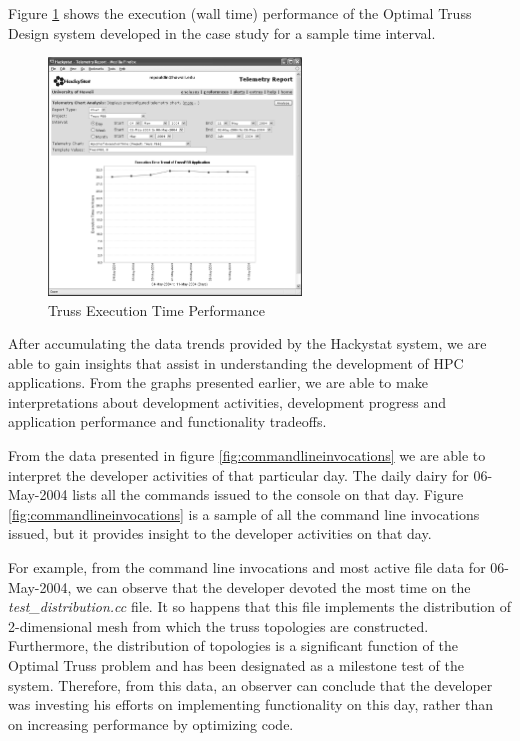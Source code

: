 \documentclass[times,10pt,twocolumn]{article}
\begin{document}
Figure \ref{fig:performance} shows the execution (wall time) performance of the 
Optimal Truss Design system developed in the case study for a sample time interval. 

\begin{figure}[htpb]
  \centering
  \includegraphics[width=0.60\textwidth]{truss.performance.eps}
  \caption{Truss Execution Time Performance}
  \label{fig:performance}
\end{figure}


\label{sec:conclusions}

After accumulating the data trends provided by the Hackystat system,
we are able to gain insights that assist in understanding the
development of HPC applications.  From the graphs presented earlier,
we are able to make interpretations about development activities,
development progress and application performance and functionality
tradeoffs.

\label{sec:devactivities}

From the data presented in figure \ref{fig:commandlineinvocations} we
are able to interpret the developer activities of that particular day.
The daily dairy for 06-May-2004 lists all the commands issued to the
console on that day.  Figure \ref{fig:commandlineinvocations} is a
sample of all the command line invocations issued, but it provides
insight to the developer activities on that day.

For example, from the command line invocations and most active file
data for 06-May-2004, we can observe that the developer devoted the
most time on the {\it test\_distribution.cc} file.  It so happens that this
file implements the distribution of 2-dimensional mesh from which the
truss topologies are constructed.  Furthermore, the distribution of
topologies is a significant function of the Optimal Truss problem and
has been designated as a milestone test of the system.  Therefore,
from this data, an observer can conclude that the developer was
investing his efforts on implementing functionality on this day,
rather than on increasing performance by optimizing code.
\end{document}
